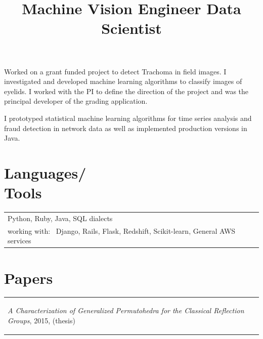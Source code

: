\documentclass[margin,line,pifont,palatino,courier]{res}
\newenvironment{list1}{
  \begin{list}{\label{ } }{
      \setlength{\itemsep}{0in}
      \setlength{\parsep}{0in} \setlength{\parskip}{0in}
      \setlength{\topsep}{0in} \setlength{\partopsep}{0in}
      \setlength{\leftmargin}{0.0in} } }{\end{list} }
\begin{document}
\begin{resume}
    \title{ Machine Vision Engineer   }

    \begin{position}
    Worked on a grant funded project to detect Trachoma in field images. I investigated and developed machine learning algorithms to classify images of eyelids. I worked with the PI to define the direction of the project and was the principal developer of the grading application.
    \end{position}
  
    \title{ Data Scientist  }

    \begin{position}
    I prototyped statistical machine learning algorithms for time series analysis and fraud detection in network data as well as implemented production versions in Java.
    \end{position}
  

\section{\sc Languages/ \\ Tools}

  \begin{tabular}{@{}p{6in}p{3in}}

     Python,  Ruby,  Java,  SQL dialects 
    \\working with: \ 
     Django, Rails, Flask,  Redshift,  Scikit-learn,  General AWS services 

  \end{tabular}


\section{\sc Papers}
  \begin{tabular}{@{}p{5in}}
    \begin{list1}
      
      
        
            \item {\em A Characterization of Generalized Permutohedra for the Classical Reflection Groups},  2015, (thesis)  
        
      \vspace{.2em}
      
        
      \vspace{.2em}
      

\end{list1}
\end{tabular}
\end{resume}
\end{document}
